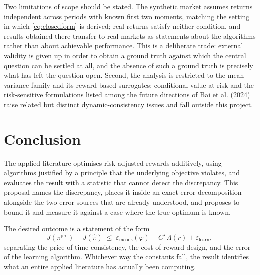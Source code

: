 \documentclass[11pt,a4paper]{article}
\theoremstyle{plain}
\theoremstyle{definition}
\newcommand{\pipre}{\pi^{\mathrm{pre}}}
\newcommand{\pihat}{\widehat{\pi}}
\newcommand{\epsincons}{\varepsilon_{\mathrm{incons}}}
\newcommand{\epslearn}{\varepsilon_{\mathrm{learn}}}
\begin{document}
Two limitations of scope should be stated. The synthetic market assumes returns
independent across periods with known first two moments, matching the setting in which
\eqref{eq:closedform} is derived; real returns satisfy neither condition, and results
obtained there transfer to real markets as statements about the algorithms rather than
about achievable performance. This is a deliberate trade: external validity is given up
in order to obtain a ground truth against which the central question can be settled at
all, and the absence of such a ground truth is precisely what has left the question
open. Second, the analysis is restricted to the mean-variance family and its
reward-based surrogates; conditional value-at-risk and the risk-sensitive formulations
listed among the future directions of Bai et al. (2024) raise related but distinct
dynamic-consistency issues and fall outside this project.

\section{Conclusion}

The applied literature optimises risk-adjusted rewards additively, using algorithms
justified by a principle that the underlying objective violates, and evaluates the
result with a statistic that cannot detect the discrepancy. This proposal names the
discrepancy, places it inside an exact error decomposition alongside the two error
sources that are already understood, and proposes to bound it and measure it against a
case where the true optimum is known.

The desired outcome is a statement of the form
\[
J(\pipre)-J(\pihat)\;\le\;\epsincons(\varphi)+C'\,\Lambda(r)+\epslearn ,
\]
separating the price of time-consistency, the cost of reward design, and the error of
the learning algorithm. Whichever way the constants fall, the result identifies what an
entire applied literature has actually been computing.

\end{document}

